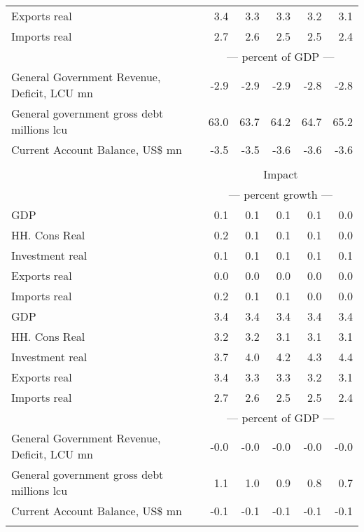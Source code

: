 \documentclass{article}
\begin{document}
\begin{table}[ht]
\begin{tabular}{lrrrrr}
Exports real & 3.4 & 3.3 & 3.3 & 3.2 & 3.1 \\
Imports real & 2.7 & 2.6 & 2.5 & 2.5 & 2.4 \\
&\multicolumn{5}{c}{--- percent of GDP ---}           \\
General Government Revenue, Deficit, LCU mn & -2.9 & -2.9 & -2.9 & -2.8 & -2.8 \\
General government gross debt millions lcu & 63.0 & 63.7 & 64.2 & 64.7 & 65.2 \\
Current Account Balance, US\$ mn & -3.5 & -3.5 & -3.6 & -3.6 & -3.6 \\
&\multicolumn{5}{c}{  }           \\
&\multicolumn{5}{c}{Impact}           \\
&\multicolumn{5}{c}{--- percent growth ---}           \\
GDP & 0.1 & 0.1 & 0.1 & 0.1 & 0.0 \\
HH. Cons Real & 0.2 & 0.1 & 0.1 & 0.1 & 0.0 \\
Investment real & 0.1 & 0.1 & 0.1 & 0.1 & 0.1 \\
Exports real & 0.0 & 0.0 & 0.0 & 0.0 & 0.0 \\
Imports real & 0.2 & 0.1 & 0.1 & 0.0 & 0.0 \\
GDP & 3.4 & 3.4 & 3.4 & 3.4 & 3.4 \\
HH. Cons Real & 3.2 & 3.2 & 3.1 & 3.1 & 3.1 \\
Investment real & 3.7 & 4.0 & 4.2 & 4.3 & 4.4 \\
Exports real & 3.4 & 3.3 & 3.3 & 3.2 & 3.1 \\
Imports real & 2.7 & 2.6 & 2.5 & 2.5 & 2.4 \\
&\multicolumn{5}{c}{--- percent of GDP ---}           \\
General Government Revenue, Deficit, LCU mn & -0.0 & -0.0 & -0.0 & -0.0 & -0.0 \\
General government gross debt millions lcu & 1.1 & 1.0 & 0.9 & 0.8 & 0.7 \\
Current Account Balance, US\$ mn & -0.1 & -0.1 & -0.1 & -0.1 & -0.1 \\
&\multicolumn{5}{c}{  }           \\
\bottomrule
\end{tabular}
\end{table}
\end{document}
